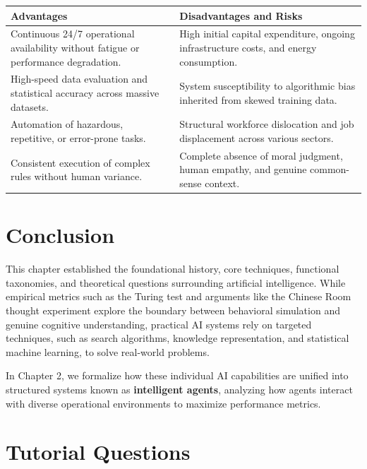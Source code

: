 \documentclass[12pt]{report}
\begin{document}
\begin{table}[htbp]
\centering
\begin{tabularx}{\textwidth}{@{} X X @{}}
\toprule
\textbf{Advantages} & \textbf{Disadvantages and Risks} \\
\midrule
Continuous 24/7 operational availability without fatigue or performance degradation. & High initial capital expenditure, ongoing infrastructure costs, and energy consumption. \\
High-speed data evaluation and statistical accuracy across massive datasets. & System susceptibility to algorithmic bias inherited from skewed training data. \\
Automation of hazardous, repetitive, or error-prone tasks. & Structural workforce dislocation and job displacement across various sectors. \\
Consistent execution of complex rules without human variance. & Complete absence of moral judgment, human empathy, and genuine common-sense context. \\
\bottomrule
\end{tabularx}
\end{table}


\section{Conclusion}

This chapter established the foundational history, core techniques, functional taxonomies, and theoretical questions surrounding artificial intelligence. While empirical metrics such as the Turing test and arguments like the Chinese Room thought experiment explore the boundary between behavioral simulation and genuine cognitive understanding, practical AI systems rely on targeted techniques, such as search algorithms, knowledge representation, and statistical machine learning, to solve real-world problems. 

In Chapter 2, we formalize how these individual AI capabilities are unified into structured systems known as \textbf{intelligent agents}, analyzing how agents interact with diverse operational environments to maximize performance metrics.


\section*{Tutorial Questions}
\end{document}
